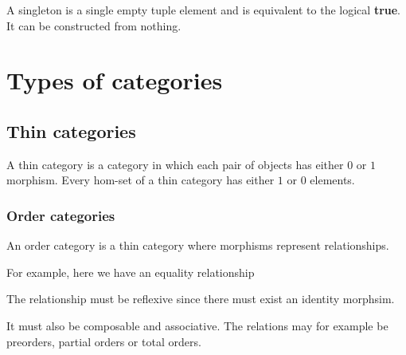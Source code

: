 \documentclass{article}
\begin{document}
A singleton is a single empty tuple element and
is equivalent to the logical \textbf{true}. It can be constructed from nothing.


\section{Types of categories}

\subsection{Thin categories}

A thin category is a category in which each pair of objects
has either \(0\) or \(1\) morphism.
Every hom-set of a thin category has either \(1\) or \(0\) elements.

\subsubsection{Order categories}

An order category is a thin category where morphisms represent relationships.

For example, here we have an equality relationship

\begin{center}
\end{center}

The relationship must be reflexive since there must exist an identity morphsim.

\begin{center}
\end{center}

It must also be composable and associative.
The relations may for example be preorders, partial orders
or total orders.

\end{document}
